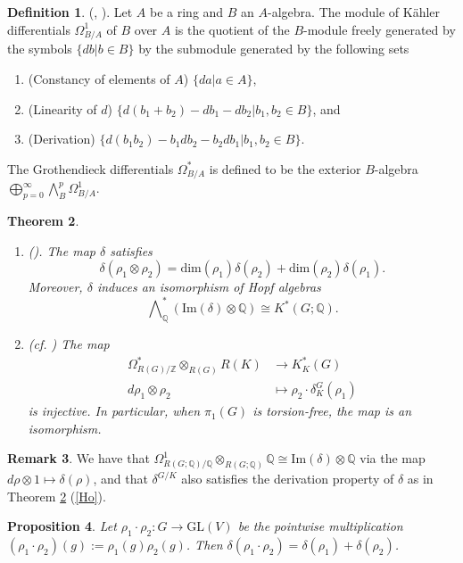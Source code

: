 \documentclass[11pt]{amsart}
\theoremstyle{plain}
\newtheorem{theorem}{Theorem}[section]
\newtheorem{proposition}[theorem]{Proposition}
\theoremstyle{definition}
\newtheorem{remark}[theorem]{Remark}
\newtheorem{definition}[theorem]{Definition}
\begin{document}
\begin{definition}(\cite[p. 172]{H}, \cite{GD}). Let $A$ be a ring and $B$ an $A$-algebra. The module of K\"ahler differentials $\Omega^1_{B/A}$ of $B$ over $A$ is the quotient of the $B$-module freely generated by the symbols $\{db| b\in B\}$ by the submodule generated by the following sets
	\begin{enumerate}
		\item(Constancy of elements of $A$) $\{da| a\in A\}$, 
		\item(Linearity of $d$) $\{d(b_1+b_2)-db_1-db_2| b_1, b_2\in B\}$, and 
		\item(Derivation) $\{d(b_1b_2)-b_1db_2-b_2db_1| b_1, b_2\in B\}$.
	\end{enumerate}
	The Grothendieck differentials $\Omega^*_{B/A}$ is defined to be the exterior $B$-algebra $\displaystyle\bigoplus_{p=0}^\infty \bigwedge\nolimits_B^p\Omega_{B/A}^1$.
\end{definition}
\begin{theorem}\label{kthrygrp}
	\begin{enumerate}
		\item \textnormal{(\cite[Theorem 2.1]{Ho}).}\label{Ho} The map $\delta$ satisfies
		\[\delta(\rho_1\otimes\rho_2)=\text{dim}(\rho_1)\delta(\rho_2)+\text{dim}(\rho_2)\delta(\rho_1).\]
		Moreover, $\delta$ induces an isomorphism of Hopf algebras
		\[\bigwedge\nolimits_\mathbb{Q}^*(\text{Im}(\delta)\otimes\mathbb{Q})\cong K^*(G; \mathbb{Q}).\]
		\item \textnormal{(cf. \cite{BZ})}\label{BZ} The map 
		\begin{align*}
			\Omega^*_{R(G)/\mathbb{Z}}\otimes_{R(G)}R(K)&\to K_K^*(G)\\
			d\rho_1\otimes\rho_2&\mapsto \rho_2\cdot\delta_K^G(\rho_1)
		\end{align*}
		is injective. In particular, when $\pi_1(G)$ is torsion-free, the map is an isomorphism.
	\end{enumerate}
\end{theorem}
\begin{remark}\label{deltaredux}
	We have that $\Omega^1_{R(G; \mathbb{Q})/\mathbb{Q}}\otimes_{R(G; \mathbb{Q})}\mathbb{Q}\cong\text{Im}(\delta)\otimes\mathbb{Q}$ via the map $d\rho\otimes 1\mapsto \delta(\rho)$, and that $\delta^{G/K}$ also satisfies the derivation property of $\delta$ as in Theorem \ref{kthrygrp} (\ref{Ho}).
\end{remark}
\begin{proposition}\label{log}
	Let $\rho_1\cdot\rho_2: G\to \text{GL}(V)$ be the pointwise multiplication $(\rho_1\cdot\rho_2)(g):=\rho_1(g)\rho_2(g)$. Then $\delta(\rho_1\cdot\rho_2)=\delta(\rho_1)+\delta(\rho_2)$.
\end{proposition}
\end{document}
